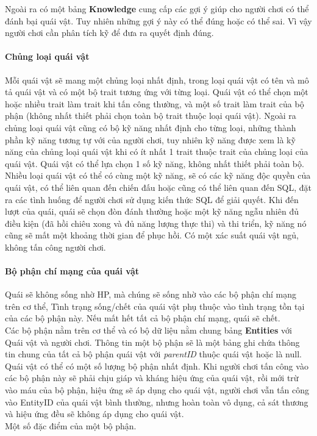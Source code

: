 \hspace*{0.5cm} Ngoài ra có một bảng \textbf{Knowledge} cung cấp các gợi ý giúp cho người chơi có thể đánh bại quái vật. Tuy nhiên những gợi ý này có thể đúng hoặc có thể sai. Vì vậy người chơi cần phân tích kỹ để đưa ra quyết định đúng.\\
\paragraph{Chủng loại quái vật}
\hspace{0.5cm} Mỗi quái vật sẽ mang một chủng loại nhất định, trong loại quái vật có tên và mô tả quái vật và có một bộ trait tương ứng với từng loại. Quái vật có thể chọn một hoặc nhiều trait làm trait khi tấn công thường, và một số trait làm trait của bộ phận (không nhất thiết phải chọn toàn bộ trait thuộc loại quái vật). Ngoài ra chủng loại quái vật cũng có bộ kỹ năng nhất định cho từng loại, những thành phần kỹ năng tương tự với của người chơi, tuy nhiên kỹ năng được xem là kỹ năng của chủng loại quái vật khi có ít nhất 1 trait thuộc trait của chủng loại của quái vật. Quái vật có thể lựa chọn 1 số kỹ năng, không nhất thiết phải toàn bộ. Nhiều loại quái vật có thể có cùng một kỹ năng, sẽ có các kỹ năng độc quyền của quái vật, có thể liên quan đến chiến đấu hoặc cũng có thể liên quan đến SQL, đặt ra các tình huống để người chơi sử dụng kiến thức SQL để giải quyết. Khi đến lượt của quái, quái sẽ chọn đòn đánh thường hoặc một kỹ năng ngẫu nhiên đủ điều kiện (đã hồi chiêu xong và đủ năng lượng thực thi) và thi triển, kỹ năng nó cũng sẽ mất một khoảng thời gian để phục hồi. Có một xác suất quái vật ngủ, không tấn công người chơi.\\

\paragraph{Bộ phận chí mạng của quái vật}
\hspace*{0.5cm} Quái sẽ không sống nhờ HP, mà chúng sẽ sống nhờ vào các bộ phận chí mạng trên cơ thể, Tình trạng sống/chết của quái vật phụ thuộc vào tình trạng tồn tại của các bộ phận này. Nếu mất hết tất cả bộ phận chí mạng, quái sẽ chết. \\
\hspace*{0.5cm} Các bộ phận nằm trên cơ thể và có bộ dữ liệu nằm chung bảng \textbf{Entities} với Quái vật và người chơi. Thông tin một bộ phận sẽ là một bảng ghi chứa thông tin chung của tất cả bộ phận quái vật với \textit{parentID} thuộc quái vật hoặc là null. Quái vật có thể có một số lượng bộ phận nhất định. Khi người chơi tấn công vào các bộ phận này sẽ phải chịu giáp và kháng hiệu ứng của quái vật, rồi mới trừ vào máu của bộ phận, hiệu ứng sẽ áp dụng cho quái vật, người chơi vẫn tấn công vào EntityID của quái vật bình thường, nhưng hoàn toàn vô dụng, cả sát thương và hiệu ứng đều sẽ không áp dụng cho quái vật.\\ Một số đặc điểm của một bộ phận. \\

